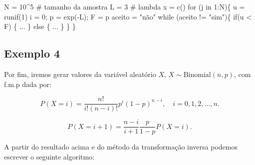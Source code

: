 \documentclass[
  letterpaper,
  DIV=11,
  numbers=noendperiod]{scrreprt}
\newenvironment{Shaded}{\begin{snugshade}}{\end{snugshade}}
\newcommand{\CommentTok}[1]{\textcolor[rgb]{0.37,0.37,0.37}{#1}}
\newcommand{\ControlFlowTok}[1]{\textcolor[rgb]{0.00,0.23,0.31}{#1}}
\newcommand{\DecValTok}[1]{\textcolor[rgb]{0.68,0.00,0.00}{#1}}
\newcommand{\FunctionTok}[1]{\textcolor[rgb]{0.28,0.35,0.67}{#1}}
\newcommand{\NormalTok}[1]{\textcolor[rgb]{0.00,0.23,0.31}{#1}}
\newcommand{\OtherTok}[1]{\textcolor[rgb]{0.00,0.23,0.31}{#1}}
\newcommand{\SpecialCharTok}[1]{\textcolor[rgb]{0.37,0.37,0.37}{#1}}
\newcommand{\StringTok}[1]{\textcolor[rgb]{0.13,0.47,0.30}{#1}}
\begin{document}
\begin{Shaded}
\begin{Highlighting}[]
\NormalTok{N }\OtherTok{=} \DecValTok{10}\SpecialCharTok{\^{}}\DecValTok{5} \CommentTok{\# tamanho da amostra}
\NormalTok{L }\OtherTok{=} \DecValTok{3}  \CommentTok{\# lambda}
\NormalTok{x }\OtherTok{=} \FunctionTok{c}\NormalTok{()}
\ControlFlowTok{for}\NormalTok{ (j }\ControlFlowTok{in} \DecValTok{1}\SpecialCharTok{:}\NormalTok{N)\{}
\NormalTok{  u }\OtherTok{=} \FunctionTok{runif}\NormalTok{(}\DecValTok{1}\NormalTok{)}
\NormalTok{  i }\OtherTok{=} \DecValTok{0}\NormalTok{; p }\OtherTok{=} \FunctionTok{exp}\NormalTok{(}\SpecialCharTok{{-}}\NormalTok{L); F }\OtherTok{=}\NormalTok{ p}
\NormalTok{  aceito }\OtherTok{=} \StringTok{"não"}
  \ControlFlowTok{while}\NormalTok{ (aceito }\SpecialCharTok{!=} \StringTok{"sim"}\NormalTok{)\{}
    \ControlFlowTok{if}\NormalTok{(u }\SpecialCharTok{\textless{}}\NormalTok{ F) \{}
\NormalTok{       ...}
\NormalTok{     \} }\ControlFlowTok{else}\NormalTok{ \{}
\NormalTok{        ...}
\NormalTok{      \}}
\NormalTok{  \}}
\NormalTok{\}}
\end{Highlighting}
\end{Shaded}

\subsection*{Exemplo 4}\label{exemplo-4}

Por fim, iremos gerar valores da variável aleatório \(X\),
\(X\sim \mbox{Binomial}(n,p)\), com f.m.p dada por:

\[P(X=i)=\dfrac{n!}{i!(n-i)!}p^i(1-p)^{n-i}, \quad i=0,1,2,\ldots,n.\]

\begin{tcolorbox}[enhanced jigsaw, coltitle=black, bottomtitle=1mm, toprule=.15mm, arc=.35mm, colframe=quarto-callout-important-color-frame, breakable, opacityback=0, bottomrule=.15mm, rightrule=.15mm, titlerule=0mm, toptitle=1mm, title={🔎 \textbf{Identidade importante:}:}, leftrule=.75mm, opacitybacktitle=0.6, left=2mm, colback=white, colbacktitle=quarto-callout-important-color!10!white]

\[P(X=i+1) = \dfrac{n-i}{i+1}\dfrac{p}{1-p}P(X=i).\]

\end{tcolorbox}

A partir do resultado acima e do método da transformação inversa podemos
escrever o seguinte algoritmo:
\end{document}
